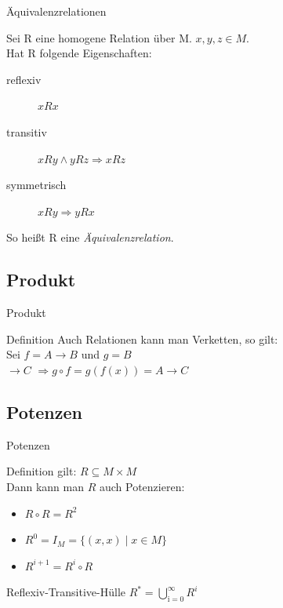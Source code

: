 	\begin{frame}{Äquivalenzrelationen}
		\begin{definition}
    	Sei R eine homogene Relation über M. $x, y, z \in M$.\\
    	Hat R folgende Eigenschaften:
			\begin{description}
				\item[reflexiv] $x R x$
				\item[transitiv] $x R y \wedge y R z \Rightarrow x R z$
				\item[symmetrisch] $x R y \Rightarrow y R x$
			\end{description}
			So heißt R eine \emph{Äquivalenzrelation}.
		\end{definition}
	\end{frame}
	
	
	\subsection{Produkt}
	\begin{frame}{Produkt}
		\begin{block}{Definition}
			Auch Relationen kann man Verketten, so gilt:\\
			Sei $f = A \rightarrow B$ und $ g = B$\\
			$\rightarrow C$ $\Rightarrow g \circ f = g(f(x)) = A \rightarrow C$
		\end{block}
	\end{frame}
	
	\subsection{Potenzen}
	\begin{frame}{Potenzen}
		\begin{block}{Definition}
			gilt: $R \subseteq M \times M$\\
			Dann kann man $R$ auch Potenzieren:\\
			\begin{itemize}
			\pause
			\item $R \circ R = R^2$\\
			
			\pause
			\item $R^0 = I_M = \{(x,x) \; | \; x \in M \}$\\
			
			\pause
			\item $R^{i+1} = R^i \circ R$
			
			\end{itemize}
		\end{block}
		
		\pause
		\begin{block}{Reflexiv-Transitive-Hülle}
			$R^* = \bigcup_\mathrm{i = 0}^\infty R^i$\\
			\vspace{10pt}
			\visible<6>{$R^*= R^0 \cup R^1 \cup R^2 \cup \dots \cup R^\infty$}
		\end{block}
	\end{frame}
	
